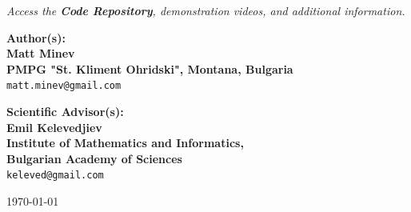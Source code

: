 \documentclass[11pt,a4paper]{report}
\begin{document}
\begin{center}
\begin{center}
\vspace{0.3em}

{\small\itshape
Access the \textbf{Code Repository}, demonstration videos, and additional information.
}
\end{center}

\vspace{1.8em}

{\large
\textbf{Author(s):} \\[1em]
\textbf{Matt Minev}\\
\textbf{PMPG "St. Kliment Ohridski", Montana, Bulgaria}\\
\texttt{matt.minev@gmail.com}
}

\vspace{1.8em}

{\large
\textbf{Scientific Advisor(s):} \\[0.5em]
\textbf{Emil Kelevedjiev}\\
\textbf{Institute of Mathematics and Informatics,} \\
\textbf{Bulgarian Academy of Sciences}\\
\texttt{keleved@gmail.com}
}

\vspace{1.8em}

{\large\today}

\end{center}

\vspace{0.5em}

\newpage
\end{document}

